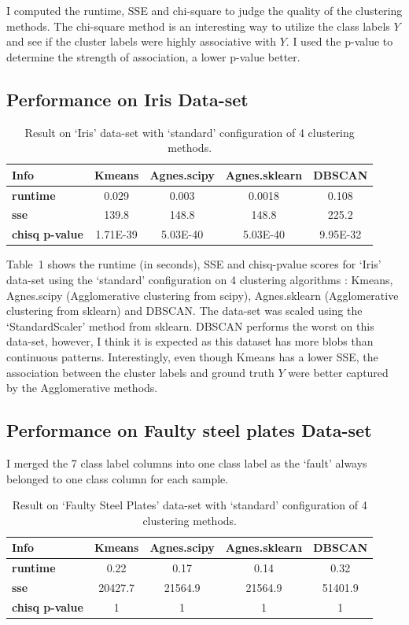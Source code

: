 \documentclass[12pt]{article}
\begin{document}
I computed the runtime, SSE and chi-square to judge the quality of the clustering methods. The chi-square method is an interesting way to utilize the class labels $Y$ and see if the cluster labels were highly associative with $Y$. I used the p-value to determine the strength of association, a lower p-value better.

\subsection*{Performance on Iris Data-set}

\begin{table}[!hptb]
\centering
\begin{tabular}{|l|c|c|c|c|}
\hline
\textbf{Info} & \textbf{Kmeans} & \textbf{Agnes.scipy} & \textbf{Agnes.sklearn} & \textbf{DBSCAN} \\\hline
\textbf{runtime} & 0.029 & 0.003 & 0.0018 & 0.108 \\
\textbf{sse} & 139.8 & 148.8 & 148.8 &	225.2 \\
\textbf{chisq p-value} & 1.71E-39 & 5.03E-40 & 5.03E-40 & 9.95E-32 \\\hline
\end{tabular}
\caption{Result on `Iris' data-set with `standard' configuration of 4  clustering methods.}
\end{table}

Table~1 shows the runtime (in seconds), SSE and chisq-pvalue scores for `Iris' data-set using the `standard' configuration on 4 clustering algorithms : Kmeans, Agnes.scipy (Agglomerative clustering from scipy), Agnes.sklearn (Agglomerative clustering from sklearn) and DBSCAN. The data-set was scaled using the `StandardScaler' method from sklearn. DBSCAN performs the worst on this data-set, however, I think it is expected as this dataset has more blobs than continuous patterns. Interestingly, even though Kmeans has a lower SSE, the association between the cluster labels and ground truth $Y$ were better captured by the Agglomerative methods.

\subsection*{Performance on Faulty steel plates Data-set}

I merged the 7 class label columns into one class label as the `fault' always belonged to one class column for each sample.

\begin{table}[!hptb]
\centering
\begin{tabular}{|l|c|c|c|c|}
\hline
\textbf{Info} & \textbf{Kmeans} & \textbf{Agnes.scipy} & \textbf{Agnes.sklearn} & \textbf{DBSCAN} \\\hline
\textbf{runtime} & 0.22 & 0.17 & 0.14 & 0.32 \\
\textbf{sse} & 20427.7 & 21564.9 & 21564.9 &	51401.9 \\
\textbf{chisq p-value} & 1 & 1 & 1 & 1 \\\hline
\end{tabular}
\caption{Result on `Faulty Steel Plates' data-set with `standard' configuration of 4  clustering methods.}
\end{table}
\end{document}
